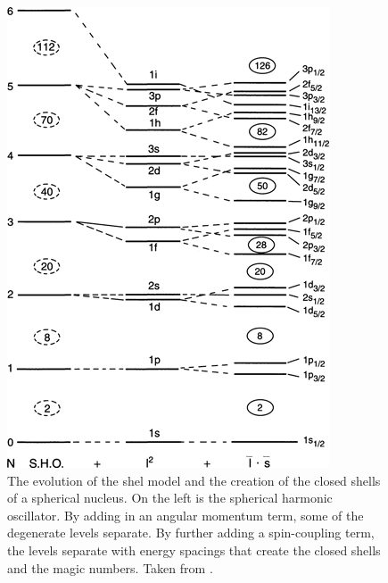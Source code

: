 \begin{figure}
    \centering
    \includegraphics[scale=2]{Introduction_Figs/ShellBreakdownCasten.png}
    \caption{The evolution of the shel model and the creation of the closed shells of a spherical nucleus. On the left is the spherical harmonic oscillator. By adding in an angular momentum term, some of the degenerate levels separate. By further adding a spin-coupling term, the levels separate with energy spacings that create the closed shells and the magic numbers. Taken from \citep{casten90:_structure}.}
    \label{fig:shellmodel}
\end{figure}